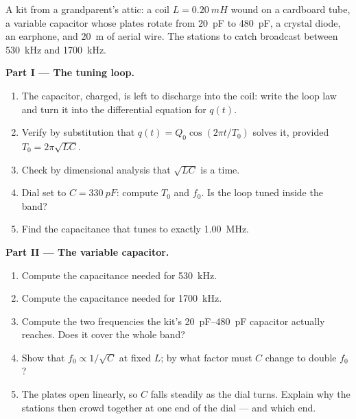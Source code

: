 \begin{problem}
\label{pb:g12:rlc-oscillations:1}
A kit from a grandparent's attic: a coil $L = \qty{0.20}{mH}$ wound on
a cardboard tube, a variable capacitor whose plates rotate from
\qty{20}{pF} to \qty{480}{pF}, a crystal diode, an earphone, and
\qty{20}{m} of aerial wire. The stations to catch broadcast between
\qty{530}{kHz} and \qty{1700}{kHz}.

\medskip
\noindent\textbf{Part I --- The tuning loop.}
\begin{enumerate}
  \item The capacitor, charged, is left to discharge into the coil:
        write the loop law and turn it into the differential equation
        for $q(t)$.
  \item Verify by substitution that $q(t) = Q_0\cos(2\pi t/T_0)$
        solves it, provided $T_0 = 2\pi\sqrt{LC}$.
  \item Check by dimensional analysis that $\sqrt{LC}$ is a time.
  \item Dial set to $C = \qty{330}{pF}$: compute $T_0$ and $f_0$. Is
        the loop tuned inside the band?
  \item Find the capacitance that tunes to exactly \qty{1.00}{MHz}.
\end{enumerate}

\medskip
\noindent\textbf{Part II --- The variable capacitor.}
\begin{enumerate}[resume]
  \item Compute the capacitance needed for \qty{530}{kHz}.
  \item Compute the capacitance needed for \qty{1700}{kHz}.
  \item Compute the two frequencies the kit's \qtyrange{20}{480}{pF}
        capacitor actually reaches. Does it cover the whole band?
  \item Show that $f_0 \propto 1/\sqrt{C}$ at fixed $L$; by what
        factor must $C$ change to double $f_0$?
  \item The plates open linearly, so $C$ falls steadily as the dial
        turns. Explain why the stations then crowd together at one end
        of the dial --- and which end.
\end{enumerate}


\end{problem}
